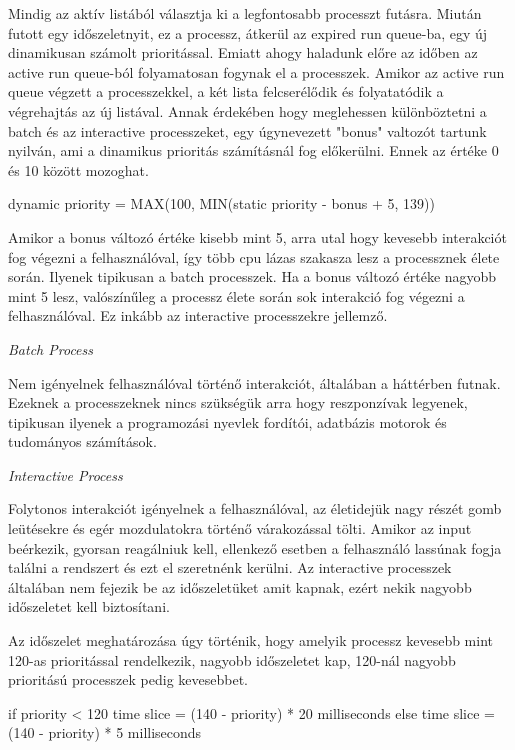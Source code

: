 Mindig az aktív listából választja ki a legfontosabb processzt futásra. Miután futott egy időszeletnyit, ez a processz, átkerül az expired run queue-ba, egy új dinamikusan számolt prioritással.
Emiatt ahogy haladunk előre az időben az active run queue-ból folyamatosan fogynak el a processzek.  Amikor az active run queue végzett a processzekkel, a két lista felcserélődik és folyatatódik a végrehajtás az új listával.
Annak érdekében hogy meglehessen különböztetni a batch és az interactive processzeket, egy úgynevezett "bonus" valtozót tartunk nyilván, ami a dinamikus prioritás számításnál fog előkerülni. Ennek az értéke 0 és 10 között mozoghat.
\begin{cpp}
dynamic priority = MAX(100, MIN(static priority - bonus + 5, 139))
\end{cpp}
Amikor a bonus változó értéke kisebb mint 5, arra utal hogy kevesebb interakciót fog végezni a felhasználóval, így több cpu lázas szakasza lesz a processznek élete során. Ilyenek tipikusan a batch processzek.
Ha a bonus változó értéke nagyobb mint 5 lesz, valószínűleg a processz élete során sok interakció fog végezni a felhasználóval. Ez inkább az interactive processzekre jellemző.

\noindent\textit{Batch Process} 

\setlength{\leftskip}{1cm}

\noindent Nem igényelnek felhasználóval történő interakciót, általában a háttérben futnak. Ezeknek a processzeknek nincs szükségük arra hogy reszponzívak legyenek, tipikusan ilyenek a programozási nyevlek fordítói, adatbázis motorok és tudományos számítások.

\setlength{\leftskip}{0pt}

\noindent\textit{Interactive Process}

\setlength{\leftskip}{1cm}

\noindent Folytonos interakciót igényelnek a felhasználóval, az életidejük nagy részét gomb leütésekre és egér mozdulatokra történő várakozással tölti.
Amikor az input beérkezik, gyorsan reagálniuk kell, ellenkező esetben a felhasználó lassúnak fogja találni a rendszert és ezt el szeretnénk kerülni.
Az interactive processzek általában nem fejezik be az időszeletüket amit kapnak, ezért nekik nagyobb időszeletet kell biztosítani. 

\setlength{\leftskip}{0pt}

Az időszelet meghatározása úgy történik, hogy amelyik processz kevesebb mint 120-as prioritással rendelkezik, nagyobb időszeletet kap, 120-nál nagyobb prioritású processzek pedig kevesebbet.
\begin{cpp}
if priority < 120 
	time slice = (140 - priority) * 20    milliseconds 
else
	time slice = (140 - priority) * 5   milliseconds 
\end{cpp}


